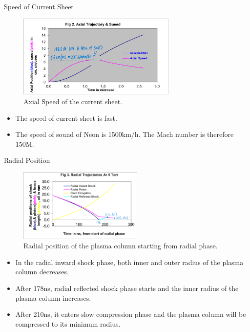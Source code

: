 \begin{frame} {Speed of Current Sheet}
    \begin{figure}
        \centering
        \includegraphics[width=0.7\textwidth]{figures/figure2.png}
        \caption{Axial Speed of the current sheet.}
        \label{fig:axial-speed}
    \end{figure}
    \begin{itemize}
        \item The speed of current sheet is fast.
        \item The speed of sound of Neon is 1500\unit{\kilo\m/\hour}. The Mach number is therefore 150M.
    \end{itemize}
\end{frame}

\begin{frame} {Radial Position}
    \begin{figure}
        \centering
        \includegraphics[width=0.55\textwidth]{figures/figure3.png}
        \caption{Radial position of the plasma column starting from radial phase.}
        \label{fig:radial-position}
    \end{figure}
    \begin{itemize}
        \item In the radial inward shock phase, both inner and outer radius of the plasma column decreases.
        \item After 178\unit{\nano\s}, radial reflected shock phase starts and the inner radius of the plasma column increases.
        \item After 210\unit{\nano\s}, it enters slow compression phase and the plasma column will be compressed to its minimum radius.
    \end{itemize}
\end{frame}

